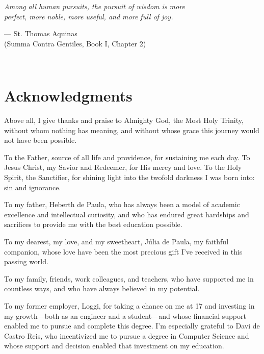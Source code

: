 
\begin{flushright}{\slshape
  Among all human pursuits, the pursuit of wisdom is more \\
  perfect, more noble, more useful, and more full of joy. \medskip

  --- St. Thomas Aquinas \\
  (Summa Contra Gentiles, Book I, Chapter 2)}
  \\ \medskip
\end{flushright}



\bigskip

\begingroup
\let\clearpage\relax
\let\cleardoublepage\relax
\let\cleardoublepage\relax
\chapter*{Acknowledgments}

Above all, I give thanks and praise to Almighty God,
the Most Holy Trinity, without whom nothing has meaning,
and without whose grace this journey would not have been possible.

To the Father, source of all life and providence, for
sustaining me each day. To Jesus Christ, my Savior and
Redeemer, for His mercy and love. To the Holy Spirit,
the Sanctifier, for shining light into the twofold darkness
I was born into: sin and ignorance.

\bigskip

To my father, Heberth de Paula, who has always been a model of
academic excellence and intellectual curiosity, and who has
endured great hardships and sacrifices to provide me
with the best education possible.

\bigskip

To my dearest, my love, and my sweetheart, Júlia de Paula, my
faithful companion, whose love have been the most precious
gift I've received in this passing world.

\bigskip

To my family, friends, work colleagues, and teachers, who
have supported me in countless ways, and who have always
believed in my potential.

\bigskip

To my former employer, Loggi, for taking a chance on me at 17
and investing in my growth—both as an engineer and a student—and
whose financial support enabled me to pursue and complete this
degree. I’m especially grateful to Davi de Castro Reis, who
incentivized me to pursue a degree in Computer Science and
whose support and decision enabled that investment on my education.

